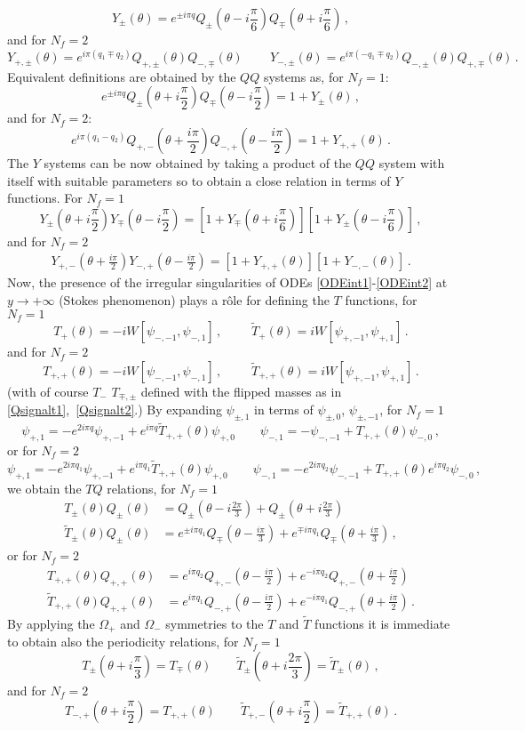 \documentclass[11pt,a4paper]{elsarticle}
\def \th {\theta}
\def \ba {\begin{aligned}}
\def \ea {\end{aligned}}
\newcommand{\be}{\begin{equation}}
\newcommand{\ee}{\end{equation}}
\def\th{\theta}
\numberwithin{figure}{section}
\numberwithin{table}{section}
\begin{document}
\be \label{intYdef1}
Y_\pm(\th)=e^{\pm i \pi q}Q_\pm(\th-i\frac{\pi}{6})Q_\mp(\th+i\frac{\pi}{6})\,,
\ee 
and for $N_f=2$
\be  \label{intYdef2}
Y_{+,\pm}(\th) =e^{ i \pi( q_1 \mp q_2)}Q_{+,\pm}(\th)Q_{-,\mp }(\th)\, \qquad Y_{-,\pm}(\th) =e^{ i \pi( -q_1 \mp q_2)}Q_{-,\pm}(\th)Q_{+,\mp }(\th)\,.
\ee
Equivalent definitions are obtained by the $QQ$ systems as, for $N_f=1$:
\be  \label{QQY1}
e^{\pm i \pi q}Q_\pm(\th+i\frac{\pi}{2})Q_\mp(\th-i\frac{\pi}{2}) = 1 + Y_\pm(\th)\,,
\ee 
and for $N_f=2$:
\be \label{QQY2}
e^{i\pi (q_1-q_2)} Q_{+,-}(\th+\frac{i \pi}{2})Q_{-,+}(\th-\frac{i \pi}{2})
= 1+Y_{+,+}(\th)\,.
\ee
The $Y$ systems can be now obtained by taking a product of the $QQ$ system with itself with suitable parameters so to obtain a close relation in terms of $Y$ functions. For $N_f=1$
\be 
\label{int-Ysys1}
Y_\pm(\th+i\frac{\pi}{2})Y_\mp(\th-i\frac{\pi}{2})=\left[1+Y_\mp(\th+i\frac{\pi}{6})\right]\left[1+Y_\pm(\th-i\frac{\pi}{6})\right] \,,
\ee  
and for $N_f=2$
\be 
\ba \label{Ysyst2}
Y_{+,-}(\th+\frac{i \pi}{2} )Y_{-,+}(\th-\frac{i \pi}{2} ) = [1 + Y_{+,+}(\th)][1 + Y_{-,-}(\th)]\,.
\ea
\ee 
Now, the presence of the irregular singularities of ODEs \eqref{ODEint1}-\eqref{ODEint2} at $y \to + \infty$ (Stokes phenomenon) plays a r\^ole for defining the $T$ functions, for $N_f=1$  
\be  \label{Tdef1}
T_{+}(\th) = - i W[\psi_{-,-1},\psi_{-,1}]\,,\qquad \,\, \tilde{T}_{+}(\th) =  i W[\psi_{+,-1},\psi_{+,1}]\,.
\ee 
and for $N_f=2$
\be  \label{Tdef2}
T_{+,+}(\th) = - i W[\psi_{-,-1},\psi_{-,1}]\,,\qquad \,\, \tilde{T}_{+,+}(\th) =  i W[\psi_{+,-1},\psi_{+,1}]\,.
\ee 
(with of course $T_-$ $T_{\mp,\pm}$ defined with the flipped masses as in \eqref{Qsignalt1},~\eqref{Qsignalt2}.)
By expanding $\psi_{\pm,1}$ in terms of $\psi_{\pm,0}$, $\psi_{\pm,-1}$, for $N_f=1$
\be \label{connLatNf1}
 \psi_{+,1} = - e^{2i \pi q}\psi_{+,-1} + e^{i \pi q} \tilde{T}_{+,+}(\th)  \psi_{+,0} \qquad \psi_{-,1} = - \psi_{-,-1} +T_{+,+}(\th) \psi_{-,0}\,,
\ee 
or for $N_f=2$
\be  	\label{connLatNf2}
\psi_{+,1} = -e^{2 i \pi q_1} \psi_{+,-1} + e^{i \pi q_1} \tilde{T}_{+,+}(\th) \psi_{+,0} \qquad \psi_{-,1} = -e^{2i \pi q_2} \psi_{-,-1} + T_{+,+}(\th) e^{i \pi q_2}\psi_{-,0}\,,
\ee 
we obtain the $TQ$ relations, for $N_f=1$
\be  \label{TQ1}
\ba
T_{\pm}(\th) Q_\pm(\th) &= Q_\pm(\th-i\frac{2\pi }{3})+Q_\pm(\th+i \frac{2\pi }{3})\,\\
\tilde{T}_{\pm}(\th) Q_{\pm}(\th) &= e^{\pm i \pi q_1} Q_\mp(\th-\frac{i \pi}{3})+e^{\mp i \pi q_1} Q_\mp(\th+\frac{i \pi}{3})\,,
\ea
\ee 
or for $N_f=2$
\be 
\ba \label{TQ2}
T_{+,+}(\th) Q_{+,+}(\th) &= e^{i \pi q_2} Q_{+,-}(\th-\frac{i \pi}{2})+e^{-i \pi q_2} Q_{+,-}(\th+\frac{i \pi}{2})\\
\tilde{T}_{+,+}(\th) Q_{+,+}(\th) &= e^{i \pi q_1} Q_{-,+}(\th-\frac{i \pi}{2})+e^{-i \pi q_1} Q_{-,+}(\th+\frac{i \pi}{2})\,.
\ea
\ee  
By applying the $\Omega_+$ and $\Omega_-$ symmetries to the $T$ and $\tilde{T}$ functions it is immediate to obtain also the periodicity relations, for $N_f=1$
\be  \label{Tper1}
T_\pm(\th+  i\frac{\pi}{3})=T_\mp (\th)\qquad \tilde{T}_\pm(\th+ i \frac{2\pi }{3})=\tilde{T}_\pm (\th)\,,
\ee
and for $N_f=2$
\be  \label{Tper2}
T_{-,+}(\th+  i\frac{\pi}{2})=T_{+,+} (\th)\qquad \tilde{T}_{+,-}(\th+ i \frac{\pi }{2})=\tilde{T}_{+,+}(\th)\,.
\ee
\end{document}
